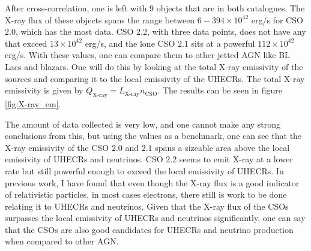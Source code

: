 
After cross-correlation, one is left with $9$ objects that are in both catalogues. The X-ray flux of these objects spans the range between $6-394 \times 10^{42}$ erg/s for CSO $2.0$, which has the most data. CSO 2.2, with three data points, does not have any that exceed $13 \times 10^{42}$ erg/s, and the lone CSO $2.1$ sits at a powerful $112 \times 10^{42}$ erg/s. With these values, one can compare them to other jetted AGN like BL Lacs and blazars. One will do this by looking at the total X-ray emissivity of the sources and comparing it to the local emissivity of the UHECRs. The total X-ray emissivity is given by $Q_{\text{X-ray}} = L_{\text{X-ray}} n_{\text{CSO}}$. The results can be seen in figure \ref{fig:X-ray_em}. 

The amount of data collected is very low, and one cannot make any strong conclusions from this, but using the values as a benchmark, one can see that the X-ray emissivity of the CSO $2.0$ and $2.1$ spans a sizeable area above the local emissivity of UHECRs and neutrinos. CSO $2.2$ seems to emit X-ray at a lower rate but still powerful enough to exceed the local emissivity of UHECRs. In previous work, I have found that even though the X-ray flux is a good indicator of relativistic particles, in most cases electrons, there still is work to be done relating it to UHECRs and neutrinos. Given that the X-ray flux of the CSOs surpasses the local emissivity of UHECRs and neutrinos significantly, one can say that the CSOs are also good candidates for UHECRs and neutrino production when compared to other AGN.



